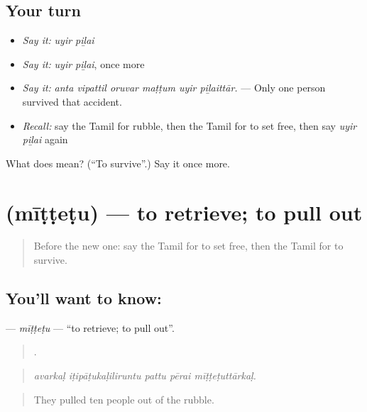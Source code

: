 \subsection*{Your turn}
\begin{itemize}
\raggedright
  \item \emph{Say it:} \emph{uyir piḻai}
  \item \emph{Say it:} \emph{uyir piḻai}, once more
  \item \emph{Say it:} \emph{anta vipattil oruvar maṭṭum uyir piḻaittār.} — Only one person survived that accident.
  \item \emph{Recall:} say the Tamil for rubble, then the Tamil for to set free, then say \emph{uyir piḻai} again
\end{itemize}

\begin{tcolorbox}[breakable,colback=teal!4,colframe=teal!35!black,title={Before you move on}]
What does   mean? (\textquotedblleft{}To survive\textquotedblright{}.) Say it once more.
\end{tcolorbox}
\section[\texorpdfstring{\ta{மீட்டெடு} (mīṭṭeṭu)}{மீட்டெடு (mīṭṭeṭu)}]{ (mīṭṭeṭu) — to retrieve; to pull out}

\label{lesson:TA-C301-mittetu}



\begin{quote}
Before the new one: say the Tamil for to set free, then the Tamil for to survive.
\end{quote}

\subsection*{You'll want to know: }
\textbf{} — \emph{mīṭṭeṭu} — \textquotedblleft{}to retrieve; to pull out\textquotedblright{}.

\begin{quote}
    .
\end{quote}

\begin{quote}
\emph{avarkaḷ iṭipāṭukaḷiliruntu pattu pērai mīṭṭeṭuttārkaḷ.}
\end{quote}

\begin{quote}
They pulled ten people out of the rubble.
\end{quote}

